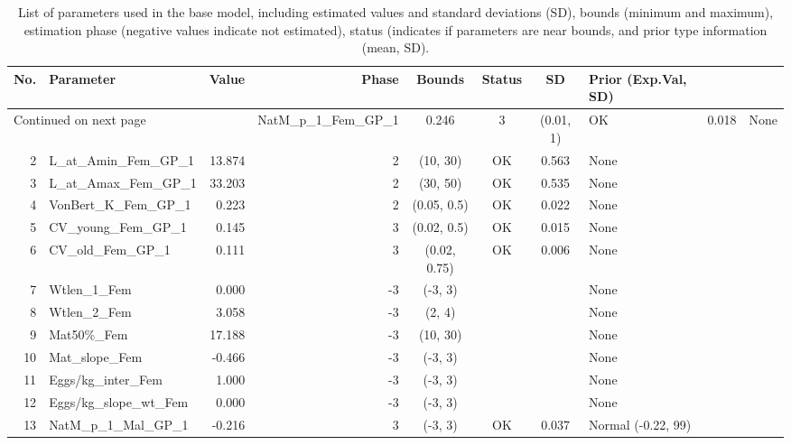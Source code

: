 \documentclass[12pt,]{article}
\begin{document}
\FloatBarrier

\FloatBarrier

\begin{landscape}
\begin{longtable}{rlrrcccl}
\caption{List of parameters used in
                                              the base model, including estimated 
                                              values and standard deviations (SD), 
                                              bounds (minimum and maximum), 
                                              estimation phase (negative values indicate
                                              not estimated), status (indicates if 
                                              parameters are near bounds, and prior type
                                              information (mean, SD).} \\ 
  \hline
No. & Parameter & Value & Phase & Bounds & Status & SD & Prior (Exp.Val, SD)  \\ 
  \hline 
\endhead 
\hline 
\multicolumn{3}{l}{\footnotesize Continued on next page} 
\endfoot 
\endlastfoot 
 \hline
1 & NatM\_p\_1\_Fem\_GP\_1 & 0.246 & 3 & (0.01, 1) & OK & 0.018 & None \\ 
  2 & L\_at\_Amin\_Fem\_GP\_1 & 13.874 & 2 & (10, 30) & OK & 0.563 & None \\ 
  3 & L\_at\_Amax\_Fem\_GP\_1 & 33.203 & 2 & (30, 50) & OK & 0.535 & None \\ 
  4 & VonBert\_K\_Fem\_GP\_1 & 0.223 & 2 & (0.05, 0.5) & OK & 0.022 & None \\ 
  5 & CV\_young\_Fem\_GP\_1 & 0.145 & 3 & (0.02, 0.5) & OK & 0.015 & None \\ 
  6 & CV\_old\_Fem\_GP\_1 & 0.111 & 3 & (0.02, 0.75) & OK & 0.006 & None \\ 
  7 & Wtlen\_1\_Fem & 0.000 & -3 & (-3, 3) &  &  & None \\ 
  8 & Wtlen\_2\_Fem & 3.058 & -3 & (2, 4) &  &  & None \\ 
  9 & Mat50\%\_Fem & 17.188 & -3 & (10, 30) &  &  & None \\ 
  10 & Mat\_slope\_Fem & -0.466 & -3 & (-3, 3) &  &  & None \\ 
  11 & Eggs/kg\_inter\_Fem & 1.000 & -3 & (-3, 3) &  &  & None \\ 
  12 & Eggs/kg\_slope\_wt\_Fem & 0.000 & -3 & (-3, 3) &  &  & None \\ 
  13 & NatM\_p\_1\_Mal\_GP\_1 & -0.216 & 3 & (-3, 3) & OK & 0.037 & Normal (-0.22, 99) \\ 

\end{longtable}
\end{landscape}
\end{document}
